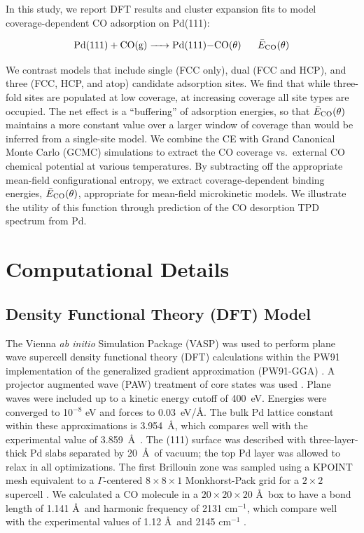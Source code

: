 \documentclass[11pt]{article}
\begin{document}
In this study, we report DFT results and cluster expansion fits to model  coverage-dependent CO adsorption on Pd(111):

\begin{equation}
	\ce{Pd(111) + CO(g) -> Pd(111)-CO(\theta)}\ \ \ \ \ \bar{E}_{\ce{CO}}(\theta)
\end{equation}

We contrast models that include single (FCC only), dual (FCC and HCP), and three (FCC, HCP, and atop) candidate adsorption sites.  We find that while three-fold sites are populated at low coverage, at increasing coverage all site types are occupied.  The net effect is a ``buffering'' of adsorption energies, so that $\bar{E}_{\ce{CO}}(\theta)$ maintains a more constant value over a larger window of coverage than would be inferred from a single-site model. We combine the CE with Grand Canonical Monte Carlo (GCMC) simulations to extract the CO coverage vs.\ external CO chemical potential at various temperatures. By subtracting off the appropriate mean-field configurational entropy, we extract coverage-dependent binding energies, $\bar{E}_{\ce{CO}}(\theta)$, appropriate for mean-field microkinetic models.  We illustrate the utility of this function through prediction of the CO desorption TPD spectrum from Pd.

\section{Computational Details}
\subsection{Density Functional Theory (DFT) Model}
The Vienna \emph{ab initio} Simulation Package (VASP) was used to perform plane wave supercell density functional theory (DFT) calculations within the PW91 implementation of the generalized gradient approximation (PW91-GGA) \cite{Kresse1996, Kresse1996a, Perdew1996, Perdew1992}. A projector augmented wave (PAW) treatment of core states was used \cite{Kresse1999, Bloch1994}. Plane waves were included up to a kinetic energy cutoff of 400~eV. Energies were converged to 10$^{-8}$ eV and forces to 0.03~eV/\AA. The bulk Pd  lattice constant within these approximations is 3.954~\AA, which compares well with the experimental value of 3.859~\AA\ \cite{DaveyWheeler1925}. %
The (111) surface was described with three-layer-thick Pd slabs separated by 20~\AA\ of vacuum; the top Pd layer was allowed to relax in all optimizations.  The first Brillouin zone was sampled using a KPOINT mesh equivalent to a $\Gamma$-centered $8\times8\times1$ Monkhorst-Pack grid for a $2\times2$ supercell \cite{Monkhorst1976}. We calculated a CO molecule in a $20\times20\times20$ \AA\ box to have a bond length of 1.141 \AA\ and harmonic frequency of 2131 cm$^{-1}$, which compare well with the experimental values of 1.12 \AA\ and 2145 cm$^{-1}$ \cite{Nakamoto2009}.
\end{document}
